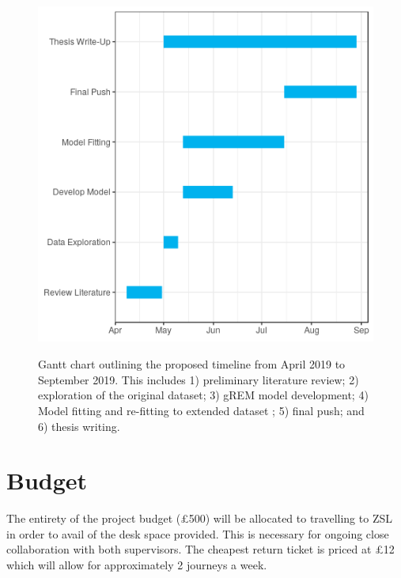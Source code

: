 \documentclass[11pt]{article}
\begin{document}
\begin{figure}[H]
	\includegraphics[height = 12cm, width=14cm]{../Data/gantt.png}
	\caption{Gantt chart outlining the proposed timeline from April 2019 to September 2019. This includes 1) preliminary literature review; 2) exploration of the original dataset; 3) gREM model development; 4) Model fitting and re-fitting to extended dataset ; 5) final push; and 6) thesis writing.}
\end{figure}

\section{Budget}
The entirety of the project budget (£500) will be allocated to travelling to ZSL in order to avail of the desk space provided. This is necessary for ongoing close collaboration with both supervisors.
The cheapest return ticket is priced at £12 which will allow for approximately 2 journeys a week.





\end{document}
